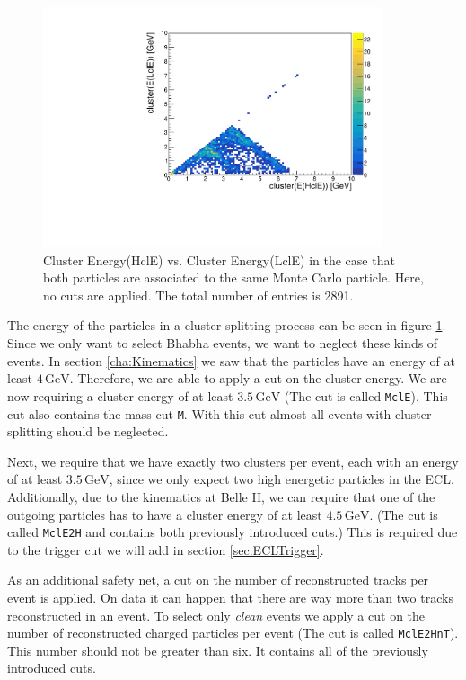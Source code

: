 \documentclass[a4paper,11pt,twosided,final,german,openbib,pdftex,listof=totoc,bibliography=totoc]{scrbook}
\begin{document}
\begin{figure}[h!]
	\centering
	\includegraphics[width=10cm]{AnhangPlots/EEdoubleMCE}
	\caption[Cluster Splitting Energy Distribution]{Cluster Energy(HclE) vs. Cluster Energy(LclE) in the case that both particles are associated to the same Monte Carlo particle. Here, no cuts are applied. The total number of entries is 2891.}
	\label{fig:clusterSplittingE}
\end{figure}


The energy of the particles in a cluster splitting process can be seen in figure \ref{fig:clusterSplittingE}. Since we only want to select Bhabha events, we want to neglect these kinds of events. In section \ref{cha:Kinematics} we saw that the particles have an energy of at least $4\,\textrm{GeV}$. Therefore, we are able to apply a cut on the cluster energy. We are now requiring a cluster energy of at least $3.5\,\textrm{GeV}$ (The cut is called \texttt{MclE}). This cut also contains the mass cut \texttt{M}. With this cut almost all events with cluster splitting should be neglected.

Next, we require that we have exactly two clusters per event, each with an energy of at least $3.5\,\textrm{GeV}$, since we only expect two high energetic particles in the ECL. Additionally, due to the kinematics at Belle II, we can require that one of the outgoing particles has to have a cluster energy of at least $4.5\,\textrm{GeV}$.  (The cut is called \texttt{MclE2H} and contains both previously introduced cuts.) This is required due to the trigger cut we will add in section \ref{sec:ECLTrigger}.

As an additional safety net, a cut on the number of reconstructed tracks per event is applied. On data it can happen that there are way more than two tracks reconstructed in an event. To select only \textit{clean} events we apply a cut on the number of reconstructed charged particles per event (The cut is called \texttt{MclE2HnT}). This number should not be greater than six. It contains all of the previously introduced cuts.
\end{document}

